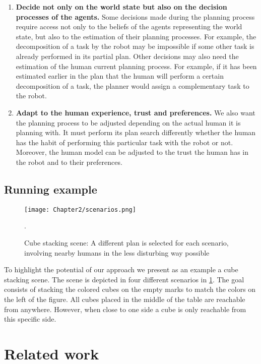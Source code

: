\begin{enumerate}
    \item \textbf{Decide not only on the world state but also on the decision processes of the agents.} Some decisions made during the planning process require access not only to the beliefs of the agents representing the world state, but also to the estimation of their planning processes. For example, the decomposition of a task by the robot may be impossible if some other task is already performed in its partial plan. Other decisions may also need the estimation of the human current planning process. For example, if it has been estimated earlier in the plan that the human will perform a certain decomposition of a task, the planner would assign a complementary task to the robot.

    \item \textbf{Adapt to the human experience, trust and preferences.} We also want the planning process to be adjusted depending on the actual human it is planning with. It must perform its plan search differently whether the human has the habit of performing this particular task with the robot or not. Moreover, the human model can be adjusted to the trust the human has in the robot and to their preferences.

\end{enumerate}

\subsection{Running example}

\begin{figure}
    \centering
    \texttt{[image: Chapter2/scenarios.png]}
    \caption{Cube stacking scene: A different plan is selected for each scenario, involving nearby humans in the less disturbing way possible}.
    \label{fig:scenarios}
\end{figure}

To highlight the potential of our approach we present as an example a cube stacking scene. The scene is depicted in four different scenarios in \ref{fig:scenarios}. The goal consists of stacking the colored cubes on the empty marks to match the colors on the left of the figure. All cubes placed in the middle of the table are reachable from anywhere. However, when close to one side a cube is only reachable from this specific side.

\section{Related work}

